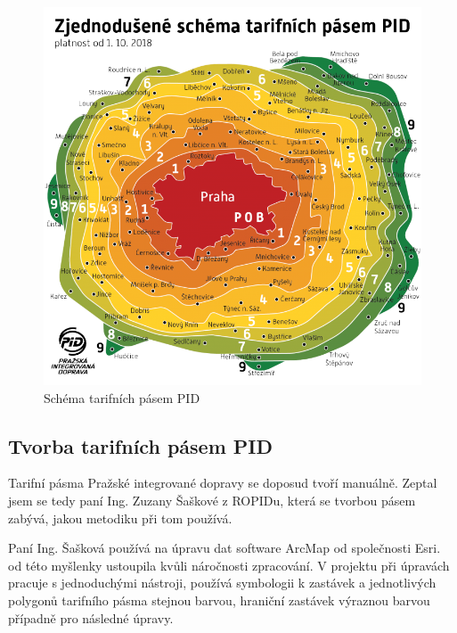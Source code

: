 \begin{figure}[H] \centering
    \includegraphics[width=400pt]{./pictures/pasma-schema.png}
    \caption[Schéma tarifních pásem PID]{Schéma tarifních pásem PID \cite{pid}}
	\label{fig:pasma-schema}                                
\end{figure}

\subsection{Tvorba tarifních pásem PID}

Tarifní pásma Pražské integrované dopravy se doposud tvoří manuálně. Zeptal jsem
se tedy paní Ing. Zuzany Šaškové z ROPIDu, která se tvorbou pásem zabývá, jakou metodiku
při tom používá. 

Paní Ing. Šašková používá na úpravu dat software ArcMap od společnosti Esri.
\textit{} od této
myšlenky ustoupila kvůli náročnosti zpracování. \textit{}
V projektu při úpravách pracuje s jednoduchými nástroji, používá symbologii k 
zastávek a jednotlivých polygonů tarifního pásma stejnou barvou, hraniční zastávek výraznou barvou 
případně pro následné úpravy. \textit{}

